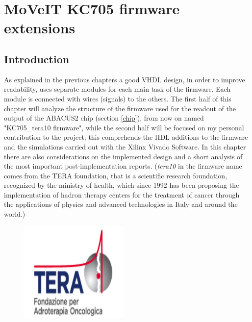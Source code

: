\chapter{MoVeIT KC705 firmware extensions}
\section{Introduction}
\noindent As explained in the previous chapters a good VHDL design, in order to improve readability, uses separate modules for each main task of the firmware. Each module is connected with wires (signals) to the others. The first half of this chapter will analyze the structure of the firmware used for the readout of the output of the ABACUS2 chip (section \ref{chip}), from now on named "KC705\_tera10 firmware", while the second half will be focused on my personal contribution to the project; this comprehends the HDL additions to the firmware and the simulations carried out with the Xilinx Vivado Software.
In this chapter there are also considerations on the implemented design and a short analysis of the most important post-implementation reports.
\newline
(\textit{tera10} in the firmware name comes from the TERA foundation, that is a scientific research foundation, recognized by the ministry of health, which since 1992 has been proposing the implementation of hadron therapy centers for the treatment of cancer through the applications of physics and advanced technologies in Italy and around the world.)
\begin{figure}[H]
	\centering
	\includegraphics[width=0.2\linewidth]{IMG/ch4/TERA}
\end{figure}
